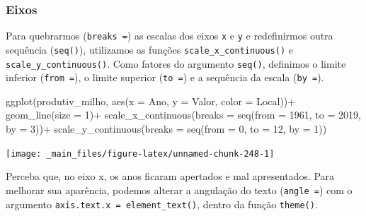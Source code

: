 \documentclass[
  brazilian,
]{book}
\newenvironment{Shaded}{\begin{snugshade}}{\end{snugshade}}
\newcommand{\AttributeTok}[1]{\textcolor[rgb]{0.77,0.63,0.00}{#1}}
\newcommand{\DecValTok}[1]{\textcolor[rgb]{0.00,0.00,0.81}{#1}}
\newcommand{\FunctionTok}[1]{\textcolor[rgb]{0.00,0.00,0.00}{#1}}
\newcommand{\NormalTok}[1]{#1}
\newcommand{\SpecialCharTok}[1]{\textcolor[rgb]{0.00,0.00,0.00}{#1}}
\begin{document}
\hypertarget{eixos}{%
\subsubsection*{Eixos}\label{eixos}}

Para quebrarmos (\texttt{breaks\ =}) as escalas dos eixos \texttt{x} e \texttt{y} e redefinirmos outra sequência (\texttt{seq()}), utilizamos as funções \texttt{scale\_x\_continuous()} e \texttt{scale\_y\_continuous()}. Como fatores do argumento \texttt{seq()}, definimos o limite inferior (\texttt{from\ =}), o limite superior (\texttt{to\ =}) e a sequência da escala (\texttt{by\ =}).

\begin{Shaded}
\begin{Highlighting}[]
\FunctionTok{ggplot}\NormalTok{(produtiv\_milho, }
       \FunctionTok{aes}\NormalTok{(}\AttributeTok{x =}\NormalTok{ Ano,}
           \AttributeTok{y =}\NormalTok{ Valor,}
           \AttributeTok{color =}\NormalTok{ Local))}\SpecialCharTok{+}
  \FunctionTok{geom\_line}\NormalTok{(}\AttributeTok{size =} \DecValTok{1}\NormalTok{)}\SpecialCharTok{+}
  \FunctionTok{scale\_x\_continuous}\NormalTok{(}\AttributeTok{breaks =} \FunctionTok{seq}\NormalTok{(}\AttributeTok{from =} \DecValTok{1961}\NormalTok{, }\AttributeTok{to =} \DecValTok{2019}\NormalTok{, }\AttributeTok{by =} \DecValTok{3}\NormalTok{))}\SpecialCharTok{+}
  \FunctionTok{scale\_y\_continuous}\NormalTok{(}\AttributeTok{breaks =} \FunctionTok{seq}\NormalTok{(}\AttributeTok{from =} \DecValTok{0}\NormalTok{, }\AttributeTok{to =} \DecValTok{12}\NormalTok{, }\AttributeTok{by =} \DecValTok{1}\NormalTok{))}
\end{Highlighting}
\end{Shaded}

\begin{center}\texttt{[image: \_main\_files/figure-latex/unnamed-chunk-248-1]} \end{center}

Perceba que, no eixo x, os anos ficaram apertados e mal apresentados. Para melhorar sua aparência, podemos alterar a angulação do texto (\texttt{angle\ =}) com o argumento \texttt{axis.text.x\ =\ element\_text()}, dentro da função \texttt{theme()}.
\end{document}
